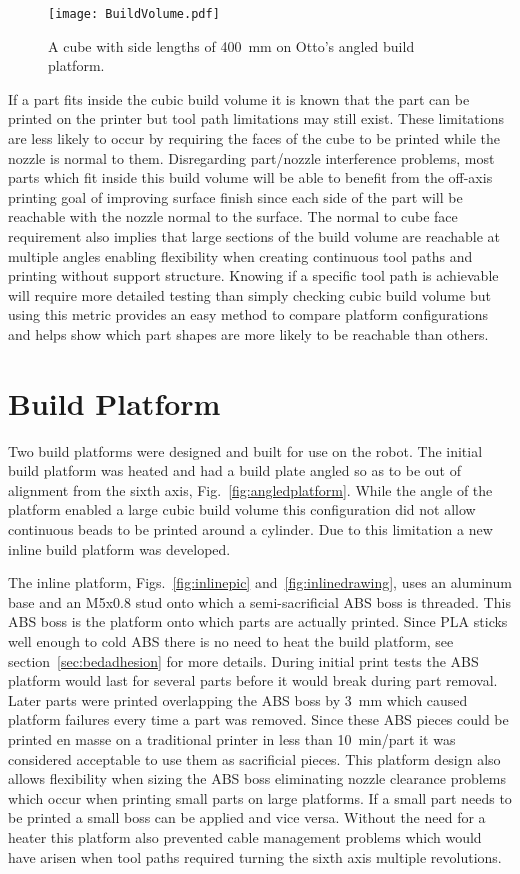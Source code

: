 \documentclass[main.tex]{subfiles}
\begin{document}
\begin{figure}
\centering
	\texttt{[image: BuildVolume.pdf]}
	\caption{A cube with side lengths of \SI{400}{mm} on Otto's angled build platform.}
	\label{fig:buildvolume}
\end{figure}

If a part fits inside the cubic build volume it is known that the part can be printed on the printer but tool path limitations may still exist.
These limitations are less likely to occur by requiring the faces of the cube to be printed while the nozzle is normal to them.
Disregarding part/nozzle interference problems, most parts which fit inside this build volume will be able to benefit from the off-axis printing goal of improving surface finish since each side of the part will be reachable with the nozzle normal to the surface.
The normal to cube face requirement also implies that large sections of the build volume are reachable at multiple angles enabling flexibility when creating continuous tool paths and printing without support structure.
Knowing if a specific tool path is achievable will require more detailed testing than simply checking cubic build volume but using this metric provides an easy method to compare platform configurations and helps show which part shapes are more likely to be reachable than others.


\section{Build Platform}
Two build platforms were designed and built for use on the robot.
The initial build platform was heated and had a build plate angled so as to be out of alignment from the sixth axis, Fig.~\ref{fig:angledplatform}.
While the angle of the platform enabled a large cubic build volume this configuration did not allow continuous beads to be printed around a cylinder.
Due to this limitation a new inline build platform was developed.

The inline platform, Figs.~\ref{fig:inlinepic} and~\ref{fig:inlinedrawing}, uses an aluminum base and an M5x0.8 stud onto which a semi-sacrificial ABS boss is threaded.
This ABS boss is the platform onto which parts are actually printed.
Since PLA sticks well enough to cold ABS there is no need to heat the build platform, see section~\ref{sec:bedadhesion} for more details.
During initial print tests the ABS platform would last for several parts before it would break during part removal.
Later parts were printed overlapping the ABS boss by \SI{3}{mm} which caused platform failures every time a part was removed.
Since these ABS pieces could be printed en masse on a traditional printer in less than \SI{10}{min/part} it was considered acceptable to use them as sacrificial pieces.
This platform design also allows flexibility when sizing the ABS boss eliminating nozzle clearance problems which occur when printing small parts on large platforms.
If a small part needs to be printed a small boss can be applied and vice versa.
Without the need for a heater this platform also prevented cable management problems which would have arisen when tool paths required turning the sixth axis multiple revolutions.
\end{document}
